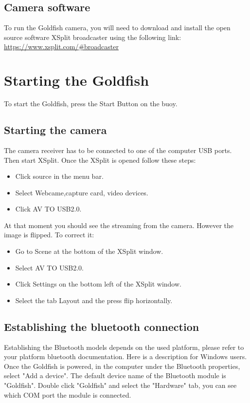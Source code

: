 \documentclass[letterpaper, 12 pt]{article}
\begin{document}
\subsection{Camera software}
To run the Goldfish camera, you will need to download and install the open source software XSplit broadcaster using the following link:
\url{https://www.xsplit.com/#broadcaster}
\section{Starting the Goldfish}
To start the Goldfish, press the Start Button on the buoy.
\subsection{Starting the camera}
The camera receiver has to be connected to one of the computer USB ports. Then start XSplit. Once the XSplit is opened follow these steps:
\begin{itemize}
\item Click source in the menu bar.
\item Select Webcame,capture card, video devices.
\item Click AV TO USB2.0.
\end{itemize}
At that moment you should see the streaming from the camera. However the image is flipped. To correct it:
\begin{itemize}
\item Go to Scene at the bottom of the XSplit window.
\item Select AV TO USB2.0.
\item Click Settings on the bottom left of the XSplit window.
\item Select the tab Layout and the press flip horizontally.
\end{itemize}
\subsection{Establishing the bluetooth connection}
Establishing the Bluetooth models depends on the used platform, please refer to your platform bluetooth documentation. Here is a description for Windows users. Once the Goldfish is powered, in the computer under the Bluetooth properties, select "Add a device". The default device name of the Bluetooth module is "Goldfish". Double click "Goldfish" and select the "Hardware" tab, you can see which COM port the module is connected.
\end{document}

